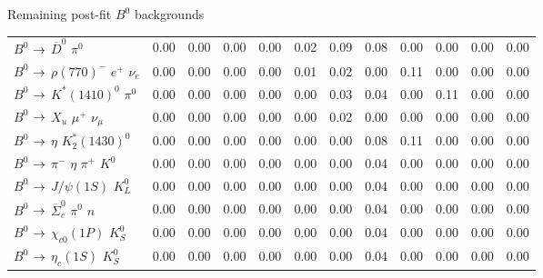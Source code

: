 \documentclass[xcolor=dvipsnames]{beamer}
\begin{document}
\begin{frame}{Remaining post-fit $B^0$ backgrounds}
{{\begin{tabular}{lrrrrrrrrrrr}
      $B^{0}$ $\rightarrow$ $\overline{D}^{0}$ $\pi^{0}$              &         0.00 &         0.00 &         0.00 &         0.00 &         0.02 &         0.09 &         0.08 &         0.00 &         0.00 &         0.00 &         0.00 \\
      $B^{0}$ $\rightarrow$ $\rho(770)^{-}$ $e^{+}$ $\nu_{e}$         &         0.00 &         0.00 &         0.00 &         0.00 &         0.01 &         0.02 &         0.00 &         0.11 &         0.00 &         0.00 &         0.00 \\
      $B^{0}$ $\rightarrow$ $K^{*}(1410)^{0}$ $\pi^{0}$               &         0.00 &         0.00 &         0.00 &         0.00 &         0.00 &         0.03 &         0.04 &         0.00 &         0.11 &         0.00 &         0.00 \\
      $B^{0}$ $\rightarrow$ $X_u$ $\mu^{+}$ $\nu_{\mu}$                 &         0.00 &         0.00 &         0.00 &         0.00 &         0.00 &         0.02 &         0.00 &         0.00 &         0.00 &         0.00 &         0.00 \\
      $B^{0}$ $\rightarrow$ $\eta$ $K_{2}^{*}(1430)^{0}$              &         0.00 &         0.00 &         0.00 &         0.00 &         0.00 &         0.00 &         0.08 &         0.11 &         0.00 &         0.00 &         0.00 \\
      $B^{0}$ $\rightarrow$ $\pi^{-}$ $\eta$ $\pi^{+}$ $K^{0}$        &         0.00 &         0.00 &         0.00 &         0.00 &         0.00 &         0.00 &         0.04 &         0.00 &         0.00 &         0.00 &         0.00 \\
      $B^{0}$ $\rightarrow$ $J/\psi(1S)$ $K_{L}^{0}$                  &         0.00 &         0.00 &         0.00 &         0.00 &         0.00 &         0.00 &         0.04 &         0.00 &         0.00 &         0.00 &         0.00 \\
      $B^{0}$ $\rightarrow$ $\overline{\Sigma}_{c}^{0}$ $\pi^{0}$ $n$ &         0.00 &         0.00 &         0.00 &         0.00 &         0.00 &         0.00 &         0.04 &         0.00 &         0.00 &         0.00 &         0.00 \\
      $B^{0}$ $\rightarrow$ $\chi_{c0}(1P)$ $K_{S}^{0}$               &         0.00 &         0.00 &         0.00 &         0.00 &         0.00 &         0.00 &         0.04 &         0.00 &         0.00 &         0.00 &         0.00 \\
      $B^{0}$ $\rightarrow$ $\eta_{c}(1S)$ $K_{S}^{0}$                &         0.00 &         0.00 &         0.00 &         0.00 &         0.00 &         0.00 &         0.04 &         0.00 &         0.00 &         0.00 &         0.00 \\

\end{tabular}}}
\end{frame}
\end{document}
